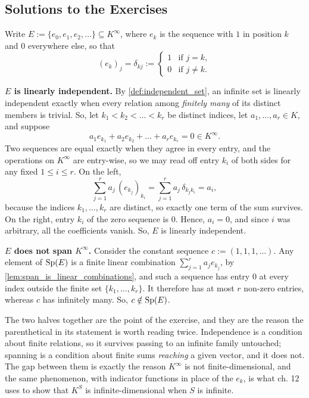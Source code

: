 \subsection{Solutions to the Exercises}
\label{sec:solutions_linear_independence}

\begin{exercisesolution}
\label{sol:k_infinity_independent}
Write $E := \{e_0, e_1, e_2, \dots\} \subseteq K^\infty$, where $e_k$ is the sequence with $1$ in position $k$ and $0$ everywhere else, so that
\[
    (e_k)_j = \delta_{kj} := \begin{cases} 1 & \text{if } j = k, \\ 0 & \text{if } j \neq k. \end{cases}
\]

\textbf{$E$ is linearly independent.} By \cref{def:independent_set}, an infinite set is linearly independent exactly when every relation among \emph{finitely many} of its distinct members is trivial. So, let $k_1 < k_2 < \dots < k_r$ be distinct indices, let $a_1, \dots, a_r \in K$, and suppose
\[
    a_1 e_{k_1} + a_2 e_{k_2} + \dots + a_r e_{k_r} = 0 \in K^\infty .
\]
Two sequences are equal exactly when they agree in every entry, and the operations on $K^\infty$ are entry-wise, so we may read off entry $k_i$ of both sides for any fixed $1 \le i \le r$. On the left,
\[
    \sum_{j=1}^{r} a_j \, (e_{k_j})_{k_i} = \sum_{j=1}^{r} a_j \, \delta_{k_j k_i} = a_i,
\]
because the indices $k_1, \dots, k_r$ are distinct, so exactly one term of the sum survives. On the right, entry $k_i$ of the zero sequence is $0$. Hence, $a_i = 0$, and since $i$ was arbitrary, all the coefficients vanish. So, $E$ is linearly independent.

\textbf{$E$ does not span $K^\infty$.} Consider the constant sequence $c := (1, 1, 1, \dots)$. Any element of $\operatorname{Sp}(E)$ is a finite linear combination $\sum_{j=1}^{r} a_j e_{k_j}$, by \cref{lem:span_is_linear_combinations}, and such a sequence has entry $0$ at every index outside the finite set $\{k_1, \dots, k_r\}$. It therefore has at most $r$ non-zero entries, whereas $c$ has infinitely many. So, $c \notin \operatorname{Sp}(E)$.

The two halves together are the point of the exercise, and they are the reason the parenthetical in its statement is worth reading twice. Independence is a condition about finite relations, so it survives passing to an infinite family untouched; spanning is a condition about finite sums \emph{reaching} a given vector, and it does not. The gap between them is exactly the reason $K^\infty$ is not finite-di\-men\-sional, and the same phenomenon, with indicator functions in place of the $e_k$, is what ch. 12 uses to show that $K^S$ is infinite-di\-men\-sional when $S$ is infinite.


\end{exercisesolution}
